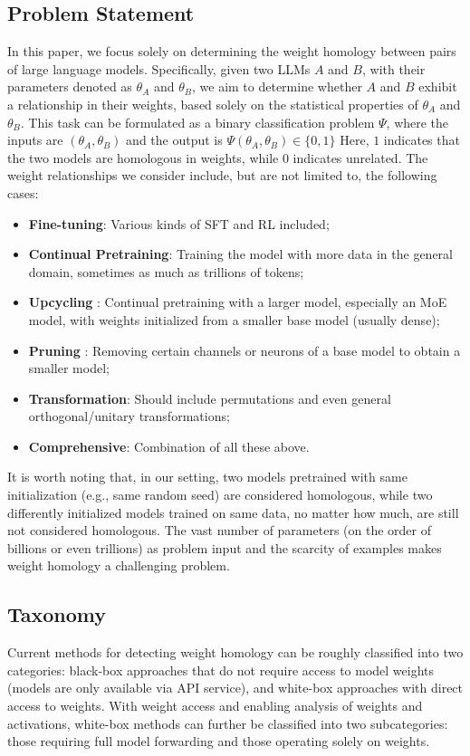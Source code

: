 \documentclass{article} %
\begin{document}
\subsection{Problem Statement}
In this paper, we focus solely on determining the weight homology between pairs of large language models.
Specifically, given two LLMs $A$ and $B$, with their parameters denoted as $\theta_A$ and $\theta_B$,
we aim to determine whether $A$ and $B$ exhibit a relationship in their weights, based solely on the statistical properties of $\theta_A$ and $\theta_B$. 
This task can be formulated as a binary classification problem $\Psi$, where the inputs are $(\theta_A, \theta_B)$ and the output is $\Psi(\theta_A, \theta_B) \in \{0, 1\}$ Here, $1$ indicates that the two models are homologous in weights, while $0$ indicates unrelated. 
The weight relationships we consider include, but are not limited to, the following cases:
\begin{itemize}
    \item \textbf{Fine-tuning}: Various kinds of SFT and RL included;
    \item \textbf{Continual Pretraining}: Training the model with more data in the general domain, sometimes as much as trillions of tokens;
    \item \textbf{Upcycling} \citep{yao2024masked,he2025upcyclinglargelanguagemodels}: Continual pretraining with a larger model, especially an MoE model, with weights initialized from a smaller base model (usually dense);
    \item \textbf{Pruning} \citep{ma2023llmpruner,meta2024llama32}: Removing certain channels or neurons of a base model to obtain a smaller model;
    \item \textbf{Transformation}: Should include permutations and even general orthogonal/unitary transformations;
    \item \textbf{Comprehensive}: Combination of all these above.
\end{itemize}
It is worth noting that, in our setting, two models pretrained with same initialization (e.g., same random seed) are considered homologous, while two differently initialized models trained on same data, no matter how much, are still not considered homologous. The vast number of parameters (on the order of billions or even trillions) as problem input and the scarcity of examples makes weight homology a challenging problem.

\subsection{Taxonomy}
Current methods for detecting weight homology can be roughly classified into two categories: black-box approaches that do not require access to model weights (models are only available via API service), and white-box approaches with direct access to weights. With weight access and enabling analysis of weights and activations, white-box methods can further be classified into two subcategories: those requiring full model forwarding and those operating solely on weights.
\end{document}
